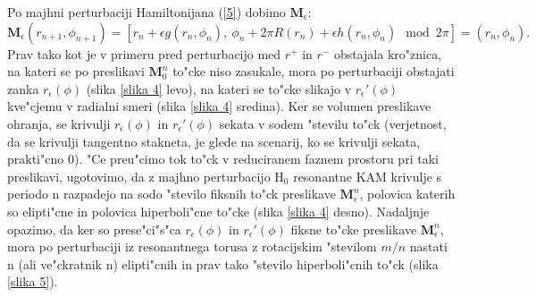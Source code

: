 \documentclass[]{article}
\begin{document}
Po majhni perturbaciji Hamiltonijana (\ref{5}) dobimo  $\boldsymbol{M}_\epsilon$:
\begin{equation}
\boldsymbol{M}_\epsilon(r_{n+1},\phi_{n+1})=[r_{n}+\epsilon g(r_n,\phi_{n}),\ \phi_{n}+2\pi R(r_n) + \epsilon h(r_n,\phi_{n}) \mod 2\pi]=(r_{n},\phi_{n}).
\end{equation}
Prav tako kot je v primeru pred perturbacijo med $r^+$ in $r^-$ obstajala kro"znica, na kateri se po preslikavi $\boldsymbol{M}_0^n$ to"cke niso zasukale, mora po perturbaciji obstajati zanka $r_\epsilon(\phi)$ (slika \ref{slika 4} levo), na kateri se to"cke slikajo v  $r_\epsilon'(\phi)$ kve"cjemu v radialni smeri (slika \ref{slika 4} sredina). Ker se volumen preslikave ohranja, se krivulji $r_\epsilon(\phi)$ in $r_\epsilon'(\phi)$ sekata v sodem "stevilu to"ck (verjetnost, da se krivulji tangentno stakneta, je glede na scenarij, ko se krivulji sekata, prakti"cno 0). "Ce preu"cimo tok to"ck v reduciranem faznem prostoru pri taki preslikavi, ugotovimo, da z majhno perturbacijo H$_0$ resonantne KAM krivulje s periodo n razpadejo na sodo "stevilo fiksnih to"ck preslikave $\boldsymbol{M}_\epsilon^n$, polovica katerih so elipti"cne in polovica hiperboli"cne to"cke (slika \ref{slika 4} desno). \newline
Nadaljnje opazimo, da ker so prese"ci"s"ca $r_\epsilon(\phi)$ in $r_\epsilon'(\phi)$ fiksne to"cke  preslikave $\boldsymbol{M}_\epsilon^n$, mora po perturbaciji iz resonantnega torusa z rotacijskim "stevilom $m/n$ nastati n (ali ve"ckratnik n) elipti"cnih in prav tako "stevilo hiperboli"cnih to"ck (slika \ref{slika 5}).
\end{document}
